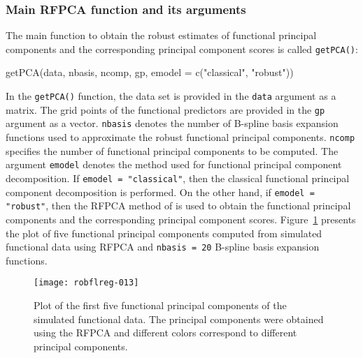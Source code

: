 \subsubsection*{Main RFPCA function and its arguments}

The main function to obtain the robust estimates of functional principal components and the corresponding principal component scores is called \texttt{getPCA()}:
\begin{smallexample}
\begin{smallverbatim}
getPCA(data, nbasis, ncomp, gp, emodel = c("classical", "robust"))
\end{smallverbatim}
\end{smallexample}
In the \texttt{getPCA()} function, the data set is provided in the \texttt{data} argument as a matrix. The grid points of the functional predictors are provided in the \texttt{gp} argument as a vector. \texttt{nbasis} denotes the number of B-spline basis expansion functions used to approximate the robust functional principal components. \texttt{ncomp} specifies the number of functional principal components to be computed. The argument \texttt{emodel} denotes the method used for functional principal component decomposition. If \texttt{emodel = "classical"}, then the classical functional principal component decomposition is performed. On the other hand, if \texttt{emodel = "robust"}, then the RFPCA method of \cite{Bali2011} is used to obtain the functional principal components and the corresponding principal component scores. Figure~\ref{fig:3} presents the plot of five functional principal components computed from simulated functional data using RFPCA and \texttt{nbasis = 20} B-spline basis expansion functions. 
\begin{figure}[!htb]
  \begin{center}
\texttt{[image: robflreg-013]}
\end{center}
\caption{Plot of the first five functional principal components of the simulated functional data. The principal components were obtained using the RFPCA and different colors correspond to different principal components.}\label{fig:3}
\end{figure}

